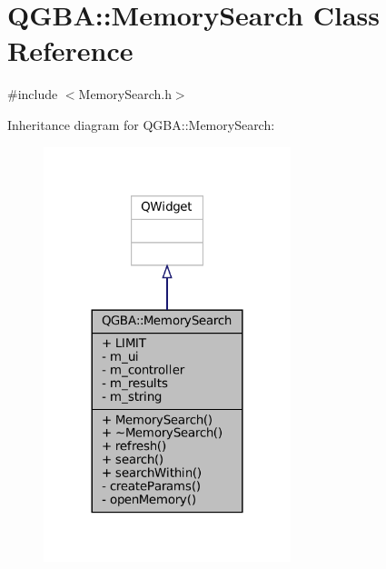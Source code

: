 \hypertarget{class_q_g_b_a_1_1_memory_search}{}\section{Q\+G\+BA\+:\+:Memory\+Search Class Reference}
\label{class_q_g_b_a_1_1_memory_search}


{\ttfamily \#include $<$Memory\+Search.\+h$>$}



Inheritance diagram for Q\+G\+BA\+:\+:Memory\+Search\+:
\nopagebreak
\begin{figure}[H]
\begin{center}
\leavevmode
\includegraphics[width=204pt]{class_q_g_b_a_1_1_memory_search__inherit__graph}
\end{center}
\end{figure}



